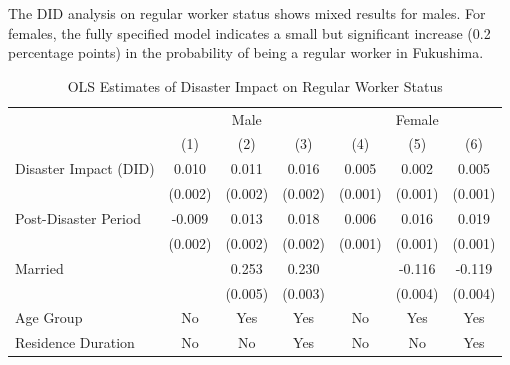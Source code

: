 \documentclass[serif, aspectratio=169]{beamer}
\begin{document}
\begin{frame}

The DID analysis on regular worker status shows mixed results for males. For females, the fully specified model indicates a small but significant increase (0.2 percentage points) in the probability of being a regular worker in Fukushima.


\begin{table}[htbp]
\centering
\caption{OLS Estimates of Disaster Impact on Regular Worker Status}

\vspace{-0.2cm}


\begin{tabular}{@{}l*{6}{c}@{}}
          &\multicolumn{3}{c}{Male}                                &\multicolumn{3}{c}{Female}                              \\\cmidrule(lr){2-4}\cmidrule(lr){5-7}
          &\multicolumn{1}{c}{(1)}         &\multicolumn{1}{c}{(2)}         &\multicolumn{1}{c}{(3)}         &\multicolumn{1}{c}{(4)}         &\multicolumn{1}{c}{(5)}         &\multicolumn{1}{c}{(6)}         \\
\toprule
Disaster Impact (DID)&    0.010\sym{***}&    0.011\sym{***}&    0.016\sym{***}&    0.005\sym{***}&    0.002         &    0.005\sym{***}\\
          &  (0.002)         &  (0.002)         &  (0.002)         &  (0.001)         &  (0.001)         &  (0.001)         \\
\addlinespace
Post-Disaster Period&   -0.009\sym{***}&    0.013\sym{***}&    0.018\sym{***}&    0.006\sym{***}&    0.016\sym{***}&    0.019\sym{***}\\
          &  (0.002)         &  (0.002)         &  (0.002)         &  (0.001)         &  (0.001)         &  (0.001)         \\
\addlinespace
Married   &                  &    0.253\sym{***}&    0.230\sym{***}&                  &   -0.116\sym{***}&   -0.119\sym{***}\\
          &                  &  (0.005)         &  (0.003)         &                  &  (0.004)         &  (0.004)         \\
\midrule
Age Group       &       No         &      Yes         &      Yes         &       No         &      Yes         &      Yes         \\
Residence Duration&       No         &       No         &      Yes         &       No         &       No         &      Yes         \\

\end{tabular}
\end{table}
\end{frame}
\end{document}
